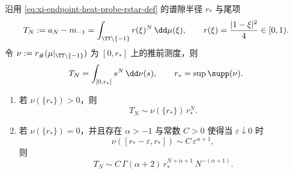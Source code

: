 \begin{theorem}[谱隙半径端点的正则变差决定尾项渐近]\label{thm:xi-endpoint-heat-probe-rstar-regular-variation-tail}
沿用 \eqref{eq:xi-endpoint-heat-probe-rstar-def} 的谱隙半径 \(r_\ast\) 与尾项
\[
T_N:=a_N-m_{-1}=\int_{\TT\setminus\{-1\}} r(\xi)^N\,\dd\mu(\xi),
\qquad r(\xi)=\frac{|1-\xi|^2}{4}\in[0,1).
\]
令 \(\nu:=r_\#(\mu|_{\TT\setminus\{-1\}})\) 为 \([0,r_\ast]\) 上的推前测度，则
\[
T_N=\int_{[0,r_\ast]} s^{N}\,\dd\nu(s),
\qquad
r_\ast=\sup\supp(\nu).
\]
\begin{enumerate}
  \item 若 \(\nu(\{r_\ast\})>0\)，则
  \[
  T_N\sim \nu(\{r_\ast\})\,r_\ast^{N}.
  \]
  \item 若 \(\nu(\{r_\ast\})=0\)，并且存在 \(\alpha>-1\) 与常数 \(C>0\) 使得当 \(\varepsilon\downarrow 0\) 时
  \[
  \nu([r_\ast-\varepsilon,r_\ast])\sim C\,\varepsilon^{\alpha+1},
  \]
  则
  \[
  T_N\sim C\,\Gamma(\alpha+2)\,r_\ast^{N+\alpha+1}\,N^{-(\alpha+1)}.
  \]
\end{enumerate}
\end{theorem}

